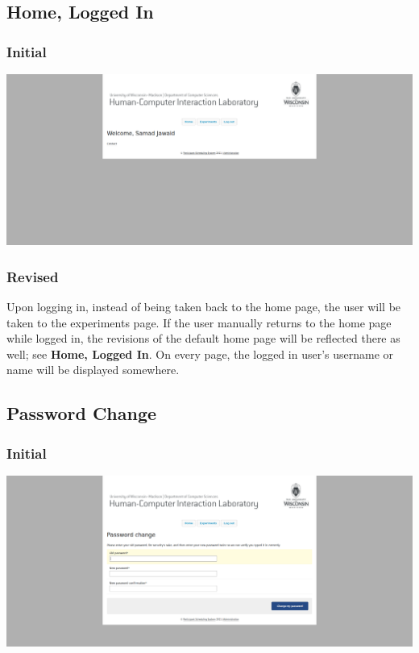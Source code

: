 \subsection{Home, Logged In}
\subsubsection{Initial}
\includegraphics[width=6in]{../other/initial-interface-design/home-2.png}
\subsubsection{Revised}
Upon logging in, instead of being taken back to the home page, the user will be taken to the experiments page. If the user manually returns to the home page while logged in, the revisions of the default home page will be reflected there as well; see \textbf{Home, Logged In}. On every page, the logged in user's username or name will be displayed somewhere.

\subsection{Password Change}
\subsubsection{Initial}
\includegraphics[width=6in]{../other/initial-interface-design/password-change.png}
